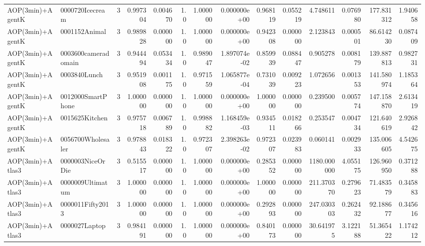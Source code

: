 \begin{tabular}{llrr|r|rr|rr|rr|rrr}
         AOP(3min)+AgentK &        0000720Icecream &       3 & 0.997304 & 0.004670 &  1.0 &      1.000000 & 0.000000e+00 &      0.968119 & 0.055219 &      4.748611 &    0.076980 &   177.831312 &    1.940658 \\
         AOP(3min)+AgentK &          0001152Animal &       3 & 0.989828 & 0.000000 &  1.0 &      1.000000 & 0.000000e+00 &      0.942308 & 0.000000 &      2.123843 &    0.000501 &    86.614230 &    0.087409 \\
         AOP(3min)+AgentK &    0003600cameradomain &       3 & 0.944494 & 0.053434 &  1.0 &      0.989047 & 1.897074e-02 &      0.859939 & 0.088447 &      0.905278 &    0.008179 &   139.887813 &    0.982731 \\
         AOP(3min)+AgentK &           0003840Lunch &       3 & 0.951908 & 0.001175 &  1.0 &      0.971559 & 1.065877e-04 &      0.731039 & 0.009223 &      1.072656 &    0.001353 &   141.580974 &    1.185364 \\
         AOP(3min)+AgentK &      0012000SmartPhone &       3 & 1.000000 & 0.000000 &  1.0 &      1.000000 & 0.000000e+00 &      1.000000 & 0.000000 &      0.239500 &    0.005774 &   147.158870 &    2.613419 \\
         AOP(3min)+AgentK &         0015625Kitchen &       3 & 0.975718 & 0.006789 &  1.0 &      0.998882 & 1.168459e-03 &      0.934511 & 0.018266 &      0.253547 &    0.004734 &   121.640619 &    2.926842 \\
         AOP(3min)+AgentK &      0056700Wholesaler &       3 & 0.978843 & 0.018322 &  1.0 &      0.972307 & 2.398263e-02 &      0.972307 & 0.023983 &      0.060141 &    0.002933 &   135.006605 &    4.542675 \\
         AOP(3min)+Atlas3 &       0000003NiceOrDie &       3 & 0.515517 & 0.000000 &  1.0 &      1.000000 & 0.000000e+00 &      0.285352 & 0.000000 &   1180.000000 &    4.055175 &   126.960950 &    0.371288 \\
         AOP(3min)+Atlas3 &       0000009Ultimatum &       3 & 1.000000 & 0.000000 &  1.0 &      1.000000 & 0.000000e+00 &      1.000000 & 0.000000 &    211.370370 &    0.279623 &    71.483579 &    0.345883 \\
         AOP(3min)+Atlas3 &       0000011Fifty2013 &       3 & 1.000000 & 0.000000 &  1.0 &      1.000000 & 0.000000e+00 &      0.292893 & 0.000000 &    247.030303 &    0.262432 &    92.188677 &    0.345616 \\
         AOP(3min)+Atlas3 &          0000027Laptop &       3 & 0.984191 & 0.000000 &  1.0 &      1.000000 & 0.000000e+00 &      0.840173 & 0.000000 &     30.641975 &    3.122188 &    51.365422 &    1.174212 \\

\end{tabular}
